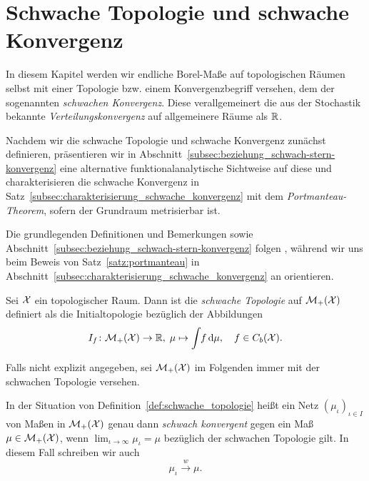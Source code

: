 \documentclass[../thesis/thesis.tex]{subfiles}
\begin{document}
	
	\chapter{Schwache Topologie und schwache Konvergenz}
	\label{chap:schwache_topologie}
	
	In diesem Kapitel werden wir endliche Borel-Maße auf topologischen Räumen selbst
	mit einer Topologie bzw. einem Konvergenzbegriff versehen, dem der sogenannten \emph{schwachen Konvergenz}. Diese
	verallgemeinert die aus der Stochastik bekannte \emph{Verteilungskonvergenz} auf allgemeinere Räume als $\mathbb{R}$. 
	
	Nachdem wir die schwache Topologie und schwache Konvergenz zunächst definieren, präsentieren wir in Abschnitt~\ref{subsec:beziehung_schwach-stern-konvergenz}
	eine alternative funktionalanalytische Sichtweise auf diese und charakterisieren die schwache Konvergenz in Satz~\ref{subsec:charakterisierung_schwache_konvergenz} mit dem \emph{Portmanteau-Theorem},
	sofern der Grundraum metrisierbar ist.
	
	Die grundlegenden Definitionen und Bemerkungen sowie Abschnitt~\ref{subsec:beziehung_schwach-stern-konvergenz} folgen 
	\cite[Abschnitte 1 bis 3]{Varadarajan.1958}, während wir uns beim Beweis von Satz~\ref{satz:portmanteau} in Abschnitt~\ref{subsec:charakterisierung_schwache_konvergenz}
	an \cite[Satz 4.14.4]{Simon.2015} orientieren.
	
	\begin{Definition}
		\label{def:schwache_topologie}
		Sei $\mathcal{X}$ ein topologischer Raum. Dann ist die \emph{schwache Topologie} auf $\mathcal{M}_{+}(\mathcal{X})$ definiert als die 
		Initialtopologie bezüglich der Abbildungen
		\[ I_f \colon \mathcal{M}_{+}(\mathcal{X}) \to \mathbb{R}, \; \mu \mapsto \int_{} \, f \, \mathrm{d}\mu , \quad f \in C_b(\mathcal{X}) \text{.} \]
	\end{Definition}

	Falls nicht explizit angegeben, sei $\mathcal{M}_{+}(\mathcal{X})$ im Folgenden immer mit der schwachen Topologie versehen.

	\begin{Definition}
		In der Situation von Definition~\ref{def:schwache_topologie} heißt ein Netz $(\mu_\iota)_{\iota \in I}$ von Maßen in $\mathcal{M}_{+}(\mathcal{X})$ genau dann 
		\emph{schwach konvergent} gegen ein Maß $\mu \in \mathcal{M}_{+}(\mathcal{X})$, wenn $\lim_{\iota \to \infty} \mu_\iota = \mu$ bezüglich der schwachen Topologie gilt.
		In diesem Fall schreiben wir auch
		\[ \mu_\iota \xrightarrow{w} \mu \text{.} \]
	\end{Definition}
\end{document}

